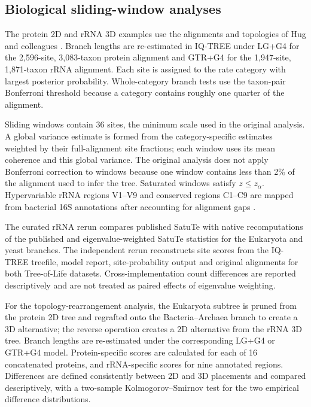 \subsection*{Biological sliding-window analyses}

The protein 2D and rRNA 3D examples use the alignments and topologies of Hug and colleagues \cite{hug2016}. Branch lengths are re-estimated in IQ-TREE under LG+G4 for the 2,596-site, 3,083-taxon protein alignment and GTR+G4 for the 1,947-site, 1,871-taxon rRNA alignment. Each site is assigned to the rate category with largest posterior probability. Whole-category branch tests use the taxon-pair Bonferroni threshold because a category contains roughly one quarter of the alignment.

Sliding windows contain 36 sites, the minimum scale used in the original analysis. A global variance estimate is formed from the category-specific estimates weighted by their full-alignment site fractions; each window uses its mean coherence and this global variance. The original analysis does not apply Bonferroni correction to windows because one window contains less than 2\% of the alignment used to infer the tree. Saturated windows satisfy \(z\leq z_\alpha\). Hypervariable rRNA regions V1--V9 and conserved regions C1--C9 are mapped from bacterial 16S annotations after accounting for alignment gaps \cite{baker2004,yang2016}.

The curated rRNA rerun compares published SatuTe with native recomputations of the published and eigenvalue-weighted SatuTe statistics for the Eukaryota and yeast branches. The independent rerun reconstructs site scores from the IQ-TREE treefile, model report, site-probability output and original alignments for both Tree-of-Life datasets. Cross-implementation count differences are reported descriptively and are not treated as paired effects of eigenvalue weighting.

For the topology-rearrangement analysis, the Eukaryota subtree is pruned from the protein 2D tree and regrafted onto the Bacteria--Archaea branch to create a 3D alternative; the reverse operation creates a 2D alternative from the rRNA 3D tree. Branch lengths are re-estimated under the corresponding LG+G4 or GTR+G4 model. Protein-specific scores are calculated for each of 16 concatenated proteins, and rRNA-specific scores for nine annotated regions. Differences are defined consistently between 2D and 3D placements and compared descriptively, with a two-sample Kolmogorov--Smirnov test for the two empirical difference distributions.

